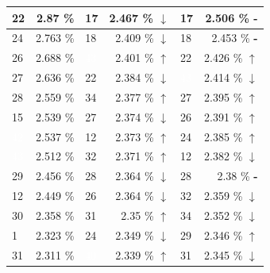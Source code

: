 \documentclass[letterpaper]{article}
\newcommand{\caseUp}[1][]{#1\textcolor[HTML]{008000}{$\mathbf{\uparrow}$}}
\newcommand{\caseStable}[1][]{#1\textcolor[HTML]{3779dd}{\textbf{-}}}
\newcommand{\caseDown}[1][]{#1\textcolor[HTML]{dd3737}{$\mathbf{\downarrow}$}}
\begin{document}
\begin{table}
\begin{tabular}{|l|r||l|r||l|r|}
	  \cellcolor[HTML]{FF4500} 22 & 2.87 \% & \cellcolor[HTML]{FF8C00} 17 & 2.467 \% \caseDown[\hfill] & \cellcolor[HTML]{FF8C00} 17 & 2.506 \% \caseStable[\hfill] \\ \hline
	  \cellcolor[HTML]{FF4500} 24 & 2.763 \% & \cellcolor[HTML]{EEEED1} 18 & 2.409 \% \caseDown[\hfill] & \cellcolor[HTML]{EEEED1} 18 & 2.453 \% \caseStable[\hfill] \\ \hline
	  \cellcolor[HTML]{E6E6FA} 26 & 2.688 \% & \cellcolor[HTML]{000000} \textcolor{white}{43} & 2.401 \% \caseUp[\hfill] & \cellcolor[HTML]{FF4500} 22 & 2.426 \% \caseUp[\hfill] \\ \hline
	  \cellcolor[HTML]{FFD700} 27 & 2.636 \% & \cellcolor[HTML]{FF4500} 22 & 2.384 \% \caseDown[\hfill] & \cellcolor[HTML]{000000} \textcolor{white}{43} & 2.414 \% \caseDown[\hfill] \\ \hline
	  \cellcolor[HTML]{FFD700} 28 & 2.559 \% & \cellcolor[HTML]{EEEED1} 34 & 2.377 \% \caseUp[\hfill] & \cellcolor[HTML]{FFD700} 27 & 2.395 \% \caseUp[\hfill] \\ \hline
	  \cellcolor[HTML]{FF69B4} 15 & 2.539 \% & \cellcolor[HTML]{FFD700} 27 & 2.374 \% \caseDown[\hfill] & \cellcolor[HTML]{E6E6FA} 26 & 2.391 \% \caseUp[\hfill] \\ \hline
	  \cellcolor[HTML]{000000} \textcolor{white}{42} & 2.537 \% & \cellcolor[HTML]{FF69B4} 12 & 2.373 \% \caseUp[\hfill] & \cellcolor[HTML]{FF4500} 24 & 2.385 \% \caseUp[\hfill] \\ \hline
	  \cellcolor[HTML]{000000} \textcolor{white}{43} & 2.512 \% & \cellcolor[HTML]{2E8B57} 32 & 2.371 \% \caseUp[\hfill] & \cellcolor[HTML]{FF69B4} 12 & 2.382 \% \caseDown[\hfill] \\ \hline
	  \cellcolor[HTML]{FFFFF0} 29 & 2.456 \% & \cellcolor[HTML]{FFD700} 28 & 2.364 \% \caseDown[\hfill] & \cellcolor[HTML]{FFD700} 28 & 2.38 \% \caseStable[\hfill] \\ \hline
	  \cellcolor[HTML]{FF69B4} 12 & 2.449 \% & \cellcolor[HTML]{E6E6FA} 26 & 2.364 \% \caseDown[\hfill] & \cellcolor[HTML]{2E8B57} 32 & 2.359 \% \caseDown[\hfill] \\ \hline
	  \cellcolor[HTML]{FFD700} 30 & 2.358 \% & \cellcolor[HTML]{BEBEBE} 31 & 2.35 \% \caseUp[\hfill] & \cellcolor[HTML]{EEEED1} 34 & 2.352 \% \caseDown[\hfill] \\ \hline
	  \cellcolor[HTML]{FFFFFF} 1 & 2.323 \% & \cellcolor[HTML]{FF4500} 24 & 2.349 \% \caseDown[\hfill] & \cellcolor[HTML]{FFFFF0} 29 & 2.346 \% \caseUp[\hfill] \\ \hline
	  \cellcolor[HTML]{BEBEBE} 31 & 2.311 \% & \cellcolor[HTML]{483D8B} \textcolor{white}{40} & 2.339 \% \caseUp[\hfill] & \cellcolor[HTML]{BEBEBE} 31 & 2.345 \% \caseDown[\hfill] \\ \hline

\end{tabular}
\end{table}
\end{document}
